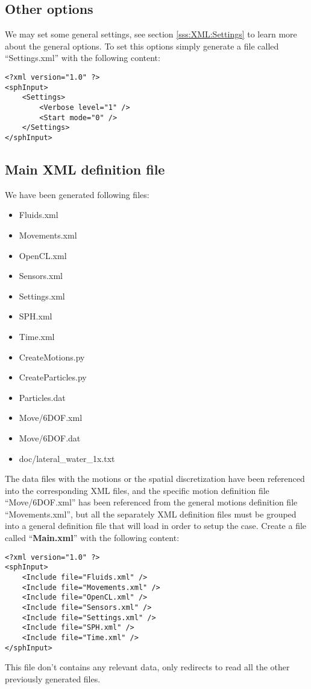 \subsection{Other options}
\label{ss:example:lateral_water_1x_deleffe:settings}
%
We may set some general \NAME settings, see section \ref{sss:XML:Settings} to learn more about the
general options. To set this options simply generate a file called ``Settings.xml'' with the following
content:
%
\begin{verbatim}
<?xml version="1.0" ?>
<sphInput>
	<Settings>
		<Verbose level="1" />
		<Start mode="0" />
	</Settings>
</sphInput>
\end{verbatim}
%
\subsection{Main XML definition file}
\label{ss:example:lateral_water_1x_deleffe:mainXML}
%
We have been generated following files:
%
\begin{itemize}
	\item Fluids.xml
	\item Movements.xml
	\item OpenCL.xml
	\item Sensors.xml
	\item Settings.xml
	\item SPH.xml
	\item Time.xml
	\item CreateMotions.py
	\item CreateParticles.py
	\item Particles.dat
	\item Move/6DOF.xml
	\item Move/6DOF.dat
	\item doc/lateral\_water\_1x.txt
\end{itemize}
%
The data files with the motions or the spatial discretization have been referenced into the corresponding
XML files, and the specific motion definition file ``Move/6DOF.xml'' has been referenced from the general
motions definition file ``Movements.xml'', but all the separately XML definition files must be grouped into
a general definition file that will load \NAME in order to setup the case. Create a file called
``\textbf{Main.xml}'' with the following content:
%
\begin{verbatim}
<?xml version="1.0" ?>
<sphInput>
	<Include file="Fluids.xml" />
	<Include file="Movements.xml" />
	<Include file="OpenCL.xml" />
	<Include file="Sensors.xml" />
	<Include file="Settings.xml" />
	<Include file="SPH.xml" />
	<Include file="Time.xml" />
</sphInput>
\end{verbatim}
%
This file don't contains any relevant data, only redirects \NAME to read all the other previously generated
files.
%
